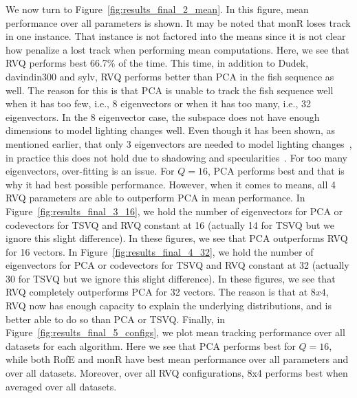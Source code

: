 \documentclass{article}
\begin{document}
We now turn to Figure~\ref{fig:results_final_2_mean}.  In this figure, mean performance over all parameters is shown.  It may be noted that monR loses track in one instance.  That instance is not factored into the means since it is not clear how penalize a lost track when performing mean computations.  Here, we see that RVQ performs best 66.7\% of the time.  This time, in addition to Dudek, davindin300 and sylv, RVQ performs better than PCA in the fish sequence as well.  The reason for this is that PCA is unable to track the fish sequence well when it has too few, i.e., 8 eigenvectors or when it has too many, i.e., 32 eigenvectors.  In the 8 eigenvector case, the subspace does not have enough dimensions to model lighting changes well.  Even though it has been shown, as mentioned earlier, that only 3 eigenvectors are needed to model lighting changes~\cite{1987_JNL_Faces_Sirovich}, in practice this does not hold due to shadowing and specularities~\cite{1997_JNL_EigenVsFisherFaces_Bel}.  For too many eigenvectors, over-fitting is an issue.  For $Q=16$, PCA performs best and that is why it had best possible performance.  However, when it comes to means, all 4 RVQ parameters are able to outperform PCA in mean performance.  In Figure~\ref{fig:results_final_3_16}, we hold the number of eigenvectors for PCA or codevectors for TSVQ and RVQ constant at 16 (actually 14 for TSVQ but we ignore this slight difference).  In these figures, we see that PCA outperforms RVQ for 16 vectors.  In Figure~\ref{fig:results_final_4_32}, we hold the number of eigenvectors for PCA or codevectors for TSVQ and RVQ constant at 32 (actually 30 for TSVQ but we ignore this slight difference).  In these figures, we see that RVQ completely outperforms PCA for 32 vectors.  The reason is that at $8x4$, RVQ now has enough capacity to explain the underlying distributions, and is better able to do so than PCA or TSVQ.  Finally, in Figure~\ref{fig:results_final_5_configs}, we plot mean tracking performance over all datasets for each algorithm.  Here we see that PCA performs best for $Q=16$, while both RofE and monR have best mean performance over all parameters and over all datasets.  Moreover, over all RVQ configurations, 8x4 performs best when averaged over all datasets.

\end{document}
